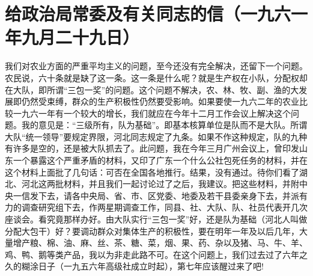 \section[给政治局常委及有关同志的信]{给政治局常委及有关同志的信（一九六一年九月二十九日）}

我们对农业方面的严重平均主义的问题，至今还没有完全解决，还留下一个问题。农民说，六十条就是缺了这一条。这一条是什么呢？就是生产权在小队，分配权却在大队，即所谓“三包一奖”的问题。这个问题不解决，农、林、牧、副、渔的大发展即仍然受束缚，群众的生产积极性仍然要受影响。如果要使一九六二年的农业比较一九六一年有一个较大的增长，我们就应在今年十二月工作会议上解决这个问题。我的意见是：“三级所有，队为基础”。即基本核算单位是队而不是大队。所谓大队“统一领导”要规定界限，河北同志规定了九条。如果不作这种规定，队的九种有许多是空的，还是被大队抓去了。此问题，我在今年三月广州会议上，曾印发山东一个暴露这个严重矛盾的材料，又印了广东一个什么公社包死任务的材料，并在这个材料上面批了几句话：可否在全国各地推行。结果，没有通过。待你们看了湖北、河北这两批材料，并且我们一起讨论过了之后，我建议。把这些材料，并附中央一信发下去，请各中央局、省、市、区党委、地委及若干县委亲身下去，并派有力的调查研究组下去，作两星期调查工作，同县、社、大队、队、社员代表开几次座谈会。看究竟那样办好。由大队实行“三包一奖”好，还是队为基础（河北人叫做分配大包干）好？要调动群众对集体生产的积极性，要在明年一年及以后几年，大量增产粮、棉、油、麻、丝、茶、糖、菜，烟、果、药、杂以及猪、马、牛、羊、鸡、鸭、鹅等类产品，我以为非走此路不可。在这个问题上，我们过去过了六年之久的糊涂日子（一九五六年高级社成立时起），第七年应该醒过来了吧!


